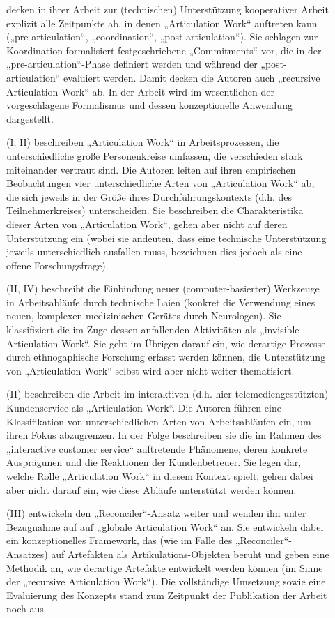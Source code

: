 \begin{description}
	\item[\citet{Raposo04}] decken in ihrer Arbeit zur (technischen) Unterstützung kooperativer Arbeit explizit alle Zeitpunkte ab, in denen „Articulation Work“ auftreten kann („pre-articulation“, „coordination“, „post-articulation“). Sie schlagen zur Koordination formalisiert festgeschriebene „Commitments“ vor, die in der „pre-articulation“-Phase definiert werden und während der „post-articulation“ evaluiert werden. Damit decken die Autoren auch „recursive Articulation Work“ \citep{Sarini02} ab. In der Arbeit wird im wesentlichen der vorgeschlagene Formalismus und dessen konzeptionelle Anwendung dargestellt.
	\item[\citet{Faergemann05}] (I, II) beschreiben „Articulation Work“ in Arbeitsprozessen, die unterschiedliche große Personenkreise umfassen, die verschieden stark miteinander vertraut sind. Die Autoren leiten auf ihren empirischen Beobachtungen vier unterschiedliche Arten von „Articulation Work“ ab, die sich jeweils in der Größe ihres Durchführungskontexts (d.h. des Teilnehmerkreises) unterscheiden. Sie beschreiben die Charakteristika dieser Arten von „Articulation Work“, gehen aber nicht auf deren Unterstützung ein (wobei sie andeuten, dass eine technische Unterstützung jeweils unterschiedlich ausfallen muss, bezeichnen dies jedoch als eine offene Forschungsfrage).
	\item[\citet{Hasu05}] (II, IV) beschreibt die Einbindung neuer (computer-basierter) Werkzeuge in Arbeitsabläufe durch technische Laien (konkret die Verwendung eines neuen, komplexen medizinischen Gerätes durch Neurologen). Sie klassifiziert die im Zuge dessen anfallenden Aktivitäten als „invisible Articulation Work“. Sie geht im Übrigen darauf ein, wie derartige Prozesse durch ethnogaphische Forschung erfasst werden können, die Unterstützung von „Articulation Work“ selbst wird aber nicht weiter thematisiert.
	\item[\citet{Hampson05}] (II) beschreiben die Arbeit im interaktiven (d.h. hier telemediengestützten) Kundenservice als „Articulation Work“. Die Autoren führen eine Klassifikation von unterschiedlichen Arten von Arbeitsabläufen ein, um ihren Fokus abzugrenzen. In der Folge beschreiben sie die im Rahmen des „interactive customer service“ auftretende Phänomene, deren konkrete Ausprägunen und die Reaktionen der Kundenbetreuer. Sie legen dar, welche Rolle „Articulation Work“ in diesem Kontext spielt, gehen dabei aber nicht darauf ein, wie diese Abläufe unterstützt werden können. 
	\item[\citet{Cabitza06}] (III) entwickeln den „Reconciler“-Ansatz weiter und wenden ihn unter Bezugnahme auf \citet{Faergemann05} auf „globale Articulation Work“ an. Sie entwickeln dabei ein konzeptionelles Framework, das (wie im Falle des „Reconciler“-Ansatzes) auf Artefakten als Artikulations-Objekten beruht und geben eine Methodik an, wie derartige Artefakte entwickelt werden können (im Sinne der „recursive Articulation Work“). Die vollständige Umsetzung sowie eine Evaluierung des Konzepts stand zum Zeitpunkt der Publikation der Arbeit noch aus. 

\end{description}
